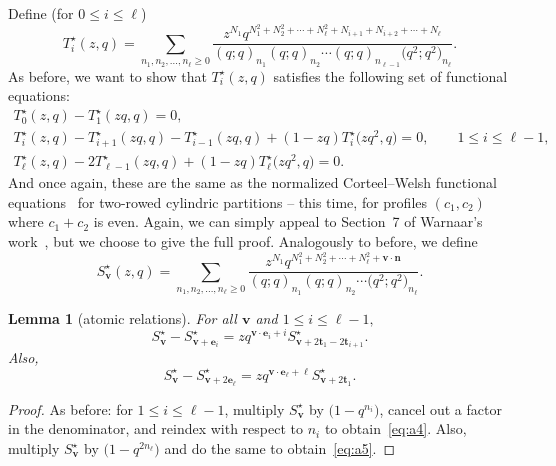 \documentclass[10pt,a4paper]{amsart}
\numberwithin{equation}{section}
\newtheorem{Lemma}[Theorem]{Lemma}
\theoremstyle{definition}
\newcommand{\tr}{\mathbf{t}}
\newcommand{\nn}{\mathbf{n}}
\newcommand{\vv}{\mathbf{v}}
\newcommand{\ee}{\mathbf{e}}
\begin{document}
Define (for $0 \le i \le \ell$)
\begin{equation} \label{eq:Tstardefn}
T^\star_i(z,q)=\sum_{n_1,n_2,\dots,n_{\ell}\ge 0} \frac{z^{N_1}q^{N_1^2+N_2^2+\cdots+N_{\ell}^2+N_{i+1}+N_{i+2}+\cdots+N_{\ell}}}{(q;q)_{n_1}(q;q)_{n_2} \cdots(q;q)_{n_{\ell-1}}\bigl(q^2;q^2\bigr)_{n_{\ell}}}.
\end{equation}
As before, we want to show that $T^\star_i(z,q)$ satisfies the following set of functional equations:
\begin{gather}
T^\star_0(z,q)-T^\star_1(zq,q) =0, \label{eq:newTsarrec1} \\
T^\star_i(z,q) - T^\star_{i+1}(zq,q) - T^\star_{i-1}(zq,q) + (1-zq)T^\star_{i}\bigl(zq^2,q\bigr) =0, \qquad 1 \le i \le \ell-1, \label{eq:newTsarrec2} \\
T^\star_\ell(z,q) - 2T^\star_{\ell-1}(zq,q) + (1-zq) T^\star_{\ell}\bigl(zq^2,q\bigr) = 0. \label{eq:newTsarrec3}
\end{gather}
And once again, these are the same as the normalized Corteel--Welsh functional equations~\cite{CW} for two-rowed cylindric partitions -- this time, for profiles $(c_1,c_2)$ where $c_1+c_2$ is even. Again, we can simply appeal to Section~7 of Warnaar's work~\cite{WarnCyl}, but we choose to give the full proof. Analogously to before, we define
\begin{equation*}
S^\star_\vv(z,q)=\sum_{n_1,n_2,\dots,n_{\ell}\ge 0} \frac{z^{N_1}q^{N_1^2+N_2^2+\cdots+N_{\ell}^2+\vv \cdot \nn}}{(q;q)_{n_1}(q;q)_{n_2}\cdots\bigl(q^2;q^2\bigr)_{n_{\ell}}}.
\end{equation*}

\begin{Lemma}[atomic relations]
For all $\vv$ and $1\le i \le \ell-1,$
\begin{equation} \label{eq:a4}
S^\star_\vv - S^\star_{\vv+\ee_i} = zq^{\vv\cdot\ee_i+i} S^\star_{\vv+2\tr_1-2\tr_{i+1}}.
\end{equation}
Also,
\begin{equation} \label{eq:a5}
S^\star_\vv - S^\star_{\vv+2\ee_\ell} = zq^{\vv\cdot\ee_\ell+\ell} S^\star_{\vv+2\tr_1}.
\end{equation}
\end{Lemma}
\begin{proof}
As before: for $1\le i \le \ell-1$, multiply $S^\star_\vv$ by $\bigl(1-q^{n_i}\bigr)$, cancel out a factor in the denominator, and reindex with respect to $n_i$ to obtain~\eqref{eq:a4}. Also, multiply $S^\star_\vv$ by $\bigl(1-q^{2n_\ell}\bigr)$ and do the same to obtain~\eqref{eq:a5}.
\end{proof}
\end{document}
